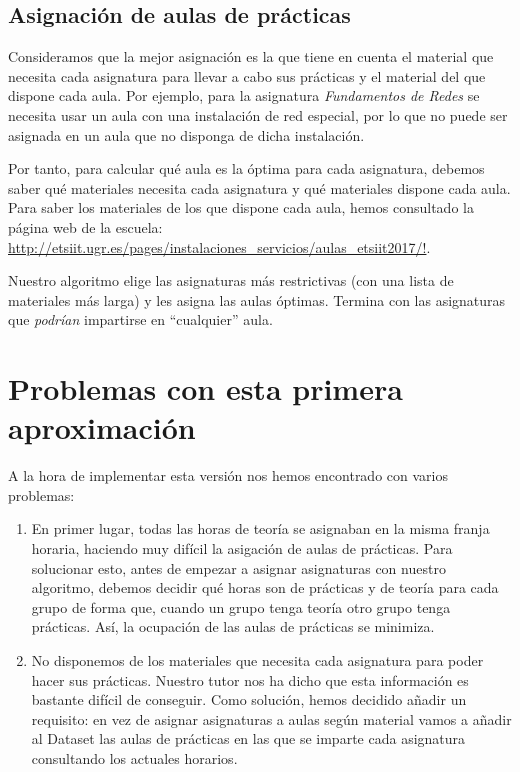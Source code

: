\subsection{Asignación de aulas de prácticas}
Consideramos que la mejor asignación es la que tiene en cuenta el material que necesita cada asignatura para llevar a cabo sus prácticas y el material del que dispone cada aula. Por ejemplo, para la asignatura \textit{Fundamentos de Redes} se necesita usar un aula con una instalación de red especial, por lo que no puede ser asignada en un aula que no disponga de dicha instalación. 

Por tanto, para calcular qué aula es la óptima para cada asignatura, debemos saber qué materiales necesita cada asignatura y qué materiales dispone cada aula. Para saber los materiales de los que dispone cada aula, hemos consultado la página web de la escuela: \url{http://etsiit.ugr.es/pages/instalaciones_servicios/aulas_etsiit2017/!}.

Nuestro algoritmo elige las asignaturas más restrictivas (con una lista de materiales más larga) y les asigna las aulas óptimas. Termina con las asignaturas que \textit{podrían} impartirse en ``cualquier'' aula.

\section{Problemas con esta primera aproximación}
A la hora de implementar esta versión nos hemos encontrado con varios problemas:

\begin{enumerate}[---]
    \item En primer lugar, todas las horas de teoría se asignaban en la misma franja horaria, haciendo muy difícil la asigación de aulas de prácticas. Para solucionar esto, antes de empezar a asignar asignaturas con nuestro algoritmo, debemos decidir qué horas son de prácticas y de teoría para cada grupo de forma que, cuando un grupo tenga teoría otro grupo tenga prácticas. Así, la ocupación de las aulas de prácticas se minimiza.

    \item No disponemos de los materiales que necesita cada asignatura para poder hacer sus prácticas. Nuestro tutor nos ha dicho que esta información es bastante difícil de conseguir. Como solución, hemos decidido añadir un requisito: en vez de asignar asignaturas a aulas según material vamos a añadir al Dataset las aulas de prácticas en las que se imparte cada asignatura consultando los actuales horarios.
\end{enumerate}

